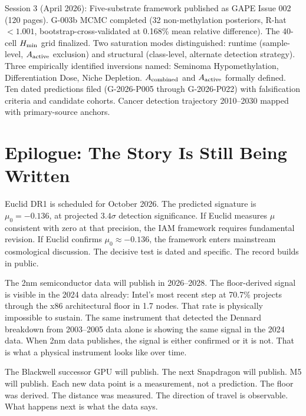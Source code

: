 \documentclass[12pt,a4paper]{article}
\begin{document}
Session 3 (April 2026): Five-substrate framework published as GAPE Issue 002
(120 pages). G-003b MCMC completed (32 non-methylation posteriors,
R-hat $< 1.001$, bootstrap-cross-validated at 0.168\% mean relative difference).
The 40-cell $H_{\rm min}$ grid finalized. Two saturation modes distinguished:
runtime (sample-level, $A_{\rm active}$ exclusion) and structural (class-level,
alternate detection strategy). Three empirically identified inversions named:
Seminoma Hypomethylation, Differentiation Dose, Niche Depletion. $A_{\rm combined}$
and $A_{\rm active}$ formally defined. Ten dated predictions filed (G-2026-P005
through G-2026-P022) with falsification criteria and candidate cohorts.
Cancer detection trajectory 2010--2030 mapped with primary-source anchors.

\newpage

\section*{Epilogue: The Story Is Still Being Written}

\noindent
Euclid DR1 is scheduled for October 2026. The predicted signature is
$\mu_0 = -0.136$, at projected $3.4\sigma$ detection significance. If Euclid
measures $\mu$ consistent with zero at that precision, the IAM framework
requires fundamental revision. If Euclid confirms $\mu_0 \approx -0.136$, the
framework enters mainstream cosmological discussion. The decisive test is dated
and specific. The record builds in public.

The 2nm semiconductor data will publish in 2026--2028. The floor-derived
signal is visible in the 2024 data already: Intel's most recent step at 70.7\%
projects through the x86 architectural floor in 1.7 nodes. That rate is
physically impossible to sustain. The same instrument that detected the
Dennard breakdown from 2003--2005 data alone is showing the same signal in the
2024 data. When 2nm data publishes, the signal is either confirmed or it is
not. That is what a physical instrument looks like over time.

The Blackwell successor GPU will publish. The next Snapdragon will publish.
M5 will publish. Each new data point is a measurement, not a prediction. The
floor was derived. The distance was measured. The direction of travel is
observable. What happens next is what the data says.
\end{document}
